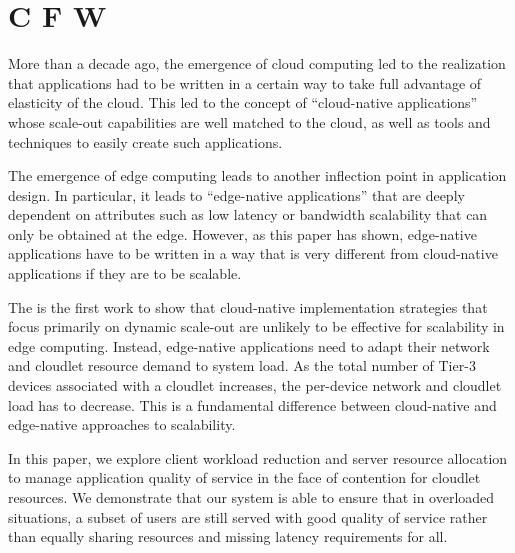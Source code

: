 \section{C  F W}
\label{sec:conclusion}


More than a decade ago, the emergence of cloud computing led to the
realization that applications had to be written in a certain way to
take full advantage of elasticity of the cloud.  This led to the
concept of ``cloud-native applications'' whose scale-out capabilities
are well matched to the cloud, as well as tools and techniques to
easily create such applications.

The emergence of edge computing leads to another inflection point in
application design.  In particular, it leads to ``edge-native
applications'' that are deeply dependent on attributes such as low
latency or bandwidth scalability that can only be obtained at the edge.
However, as this paper has shown, edge-native applications have to be 
written in a way that is very different from cloud-native applications
if they are to be scalable.

The is the first work to show that cloud-native implementation
strategies that focus primarily on dynamic scale-out are unlikely to
be effective for scalability in edge computing.  Instead, edge-native
applications need to adapt their network and cloudlet resource demand
to system load.  As the total number of Tier-3 devices associated with
a cloudlet increases, the per-device network and cloudlet load has to
decrease.  This is a fundamental difference between cloud-native and
edge-native approaches to scalability. 

In this paper, we explore client workload reduction and server resource
allocation to manage application quality of service in the face of contention
for cloudlet resources. We demonstrate that our system is able to ensure that in
overloaded situations, a subset of users are still served with good quality of
service rather than equally sharing resources and missing latency
requirements for all.

